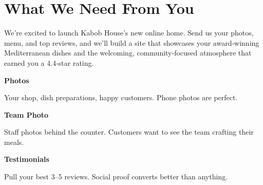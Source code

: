\documentclass[11pt,letterpaper]{article}
\begin{document}
\vspace{0.2em}

\section*{What We Need From You}

We’re excited to launch Kabob House’s new online home. Send us your photos, menu, and top reviews, and we’ll build a site that showcases your award‑winning Mediterranean dishes and the welcoming, community‑focused atmosphere that earned you a 4.4‑star rating.

\vspace{0.12em}

\noindent\begin{minipage}[t]{0.48\textwidth}
\begin{tcolorbox}[colframe=accent-teal, boxrule=1pt, left=0.7em, right=0.7em, top=0.5em, bottom=0.5em, arc=4pt, boxsep=0pt]
{\bfseries\small\color{accent-teal}Photos}

\vspace{0.15em}

{\small Your shop, dish preparations, happy customers. Phone photos are perfect.}
\end{tcolorbox}

\vspace{0.1em}

\begin{tcolorbox}[colframe=accent-teal, boxrule=1pt, left=0.7em, right=0.7em, top=0.5em, bottom=0.5em, arc=4pt, boxsep=0pt]
{\bfseries\small\color{accent-teal}Team Photo}

\vspace{0.15em}

{\small Staff photos behind the counter. Customers want to see the team crafting their meals.}
\end{tcolorbox}

\vspace{0.1em}

\begin{tcolorbox}[colframe=accent-teal, boxrule=1pt, left=0.7em, right=0.7em, top=0.5em, bottom=0.5em, arc=4pt, boxsep=0pt]
{\bfseries\small\color{accent-teal}Testimonials}

\vspace{0.15em}

{\small Pull your best 3--5 reviews. Social proof converts better than anything.}
\end{tcolorbox}
\end{minipage}
\end{document}
